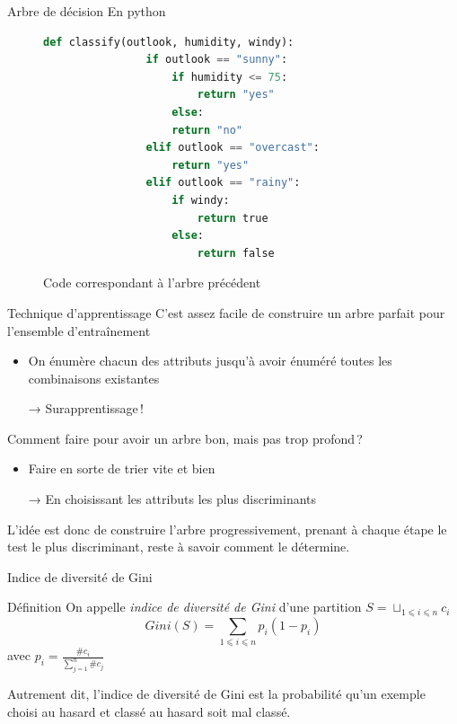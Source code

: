 \documentclass[hyperref={unicode}, xcolor={svgnames}, french]{beamer}
\begin{document}
\begin{frame}[fragile]{Arbre de décision}
    En python
    \begin{figure}
        \begin{lstlisting}[gobble=12, language=Python]
            def classify(outlook, humidity, windy):
                if outlook == "sunny":
                    if humidity <= 75:
                        return "yes"
                    else:
                    return "no"
                elif outlook == "overcast":
                    return "yes"
                elif outlook == "rainy":
                    if windy:
                        return true
                    else:
                        return false
        \end{lstlisting}
        \caption{Code correspondant à l'arbre précédent}
    \end{figure}
\end{frame}

\begin{frame}{Technique d'apprentissage}
    C'est assez facile de construire un arbre parfait pour l'ensemble d'entraînement
    \pause
    \begin{itemize}
        \item On énumère chacun des attributs jusqu'à avoir énuméré toutes les combinaisons existantes
        \item[→] Surapprentissage !
    \end{itemize}
    Comment faire pour avoir un arbre bon, mais pas trop profond ?
    \pause
    \begin{itemize}
        \item Faire en sorte de trier vite et bien
        \item[→] En choisissant les attributs les plus discriminants
    \end{itemize}
    L'idée est donc de construire l'arbre progressivement, prenant à chaque étape le test le plus \alert{discriminant}, reste à savoir comment le détermine.
\end{frame}

\begin{frame}{Indice de diversité de Gini}
    \begin{block}{Définition}
        On appelle \emph{indice de diversité de Gini} d'une partition $S=⊔_{1⩽i⩽n}c_i$
        \begin{equation}
            Gini(S) = ∑_{1⩽i⩽n}p_i(1-p_i)
        \end{equation}
        avec $p_i=\frac{\#c_i}{∑_{j=1}^n\#c_j}$
    \end{block}
    Autrement dit, l'indice de diversité de Gini est la probabilité qu'un exemple choisi au hasard et classé au hasard soit mal classé.
\end{frame}
\end{document}
